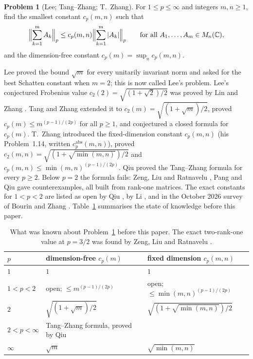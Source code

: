 \documentclass[11pt,a4paper]{article}
\numberwithin{equation}{section}
\theoremstyle{definition}
\newtheorem{problem}[theorem]{Problem}
\theoremstyle{remark}
\newcommand{\C}{\mathbb C}
\begin{document}
\begin{problem}[Lee; Tang--Zhang; T.~Zhang]\label{prob:main}
For \(1\le p\le\infty\) and integers \(m,n\ge1\), find the smallest
constant \(c_p(m,n)\) such that
\begin{equation}\label{eq:problem}
 \Bigl\|\sum_{k=1}^{m}A_k\Bigr\|_p\le c_p(m,n)
 \Bigl\|\sum_{k=1}^{m}|A_k|\Bigr\|_p
 \qquad\text{for all }A_1,\ldots,A_m\in M_n(\C),
\end{equation}
and the dimension-free constant \(c_p(m)=\sup_n c_p(m,n)\).
\end{problem}

Lee \cite{Lee2010,Lee2012} proved the bound \(\sqrt m\) for every
unitarily invariant norm and asked for the best Schatten constant when
\(m=2\); this is now called Lee's problem. Lee's conjectured Frobenius
value \(c_2(2)=\sqrt{(1+\sqrt2)/2}\) was proved by Lin and Zhang
\cite{LinZhang}. Tang and Zhang \cite{TangZhang} extended it to
\(c_2(m)=\sqrt{(1+\sqrt m)/2}\), proved
\(c_p(m)\le m^{(p-1)/(2p)}\) for all \(p\ge1\), and conjectured a closed
formula for \(c_p(m)\). T.~Zhang \cite{Zhang} introduced the
fixed-dimension constant \(c_p(m,n)\) (his Problem~1.14, written
\(c_p^{\mathrm{abs}}(m,n)\)), proved
\(c_2(m,n)=\sqrt{(1+\sqrt{\min(m,n)})/2}\) and
\(c_p(m,n)\le\min(m,n)^{(p-1)/(2p)}\). Qiu \cite{Qiu} proved the
Tang--Zhang formula for every \(p\ge2\). Below \(p=2\) the formula
fails: Zeng, Liu and Ratnavelu \cite{Zeng,ZengInterval}, Pang \cite{Pang}
and Qiu \cite{Qiu} gave counterexamples, all built from rank-one
matrices. The exact constants for \(1<p<2\) are listed as open by Qiu
\cite[Question 5.1]{Qiu}, by Li \cite[Problem 4.2]{Li}, and in the
October 2026 survey of Bourin and Zhang \cite[Problem 5.9]{BourinZhang}.
Table~\ref{tab:known} summarises the state of knowledge before this
paper.

\begin{table}[ht]
\centering
\small
\begin{tabular}{@{}lll@{}}
\toprule
\(p\) & dimension-free \(c_p(m)\) & fixed dimension \(c_p(m,n)\)\\
\midrule
\(1\) & \(1\) & \(1\)\\
\(1<p<2\) & open; \(\le m^{(p-1)/(2p)}\) \cite{TangZhang} &
  open; \(\le\min(m,n)^{(p-1)/(2p)}\) \cite{Zhang}\\
\(2\) & \(\sqrt{(1+\sqrt m)/2}\) \cite{LinZhang,TangZhang} &
  \(\sqrt{(1+\sqrt{\min(m,n)})/2}\) \cite{Zhang}\\
\(2<p<\infty\) & Tang--Zhang formula, proved by Qiu \cite{Qiu} & \\
\(\infty\) & \(\sqrt m\) \cite{TangZhang} & \(\sqrt{\min(m,n)}\) \cite{Zhang}\\
\bottomrule
\end{tabular}
\caption{What was known about Problem~\ref{prob:main} before this paper.
The exact two-rank-one value at \(p=3/2\) was found by Zeng, Liu and
Ratnavelu \cite{ZengExact}.}
\label{tab:known}
\end{table}
\end{document}
